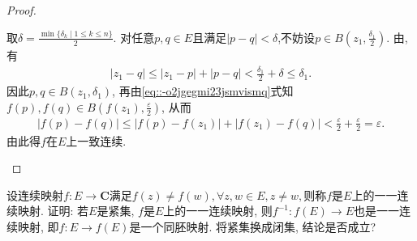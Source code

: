 \documentclass[../../main.tex]{subfiles}%
\begin{document}
\begin{proof}
\begin{enumerate}[(1)]
取$\delta=\frac{\min \{\delta _k\mid 1\leqslant k\leqslant n\}}{2}$. 对任意$p,q\in E$且满足$|p-q|<\delta$,不妨设$p\in B(z_1,\frac{\delta_1}{2})$. 由, 有
\begin{align*}
|z_1-q|\leqslant |z_1-p|+|p-q|<\frac{\delta_1}{2}+\delta\leqslant \delta_1.
\end{align*}
因此$p,q\in B(z_1,\delta_1)$, 再由\eqref{eq::-o2jgegmi23jsmvismq}式知$f(p),f(q)\in B(f(z_1),\frac{\varepsilon}{2})$, 从而
\begin{align*}
|f(p)-f(q)|\leqslant |f(p)-f(z_1)|+|f(z_1)-f(q)|<\frac{\varepsilon}{2}+\frac{\varepsilon}{2}=\varepsilon.
\end{align*}
由此得$f$在$E$上一致连续.
\end{enumerate}
\end{proof}

\begin{proposition}\label{proposition:复变例1.7}
设连续映射\(f:E \to \bm{C}\)满足\(f(z) \neq f(w), \forall z,w \in E, z \neq w,\)则称\(f\)是\(E\)上的一一连续映射. 证明: 若\(E\)是紧集, \(f\)是\(E\)上的一一连续映射, 则\(f^{-1}: f(E) \to E\)也是一一连续映射, 即\(f:E \to f(E)\)是一个同胚映射. 将紧集换成闭集, 结论是否成立?
\end{proposition}
\end{document}
